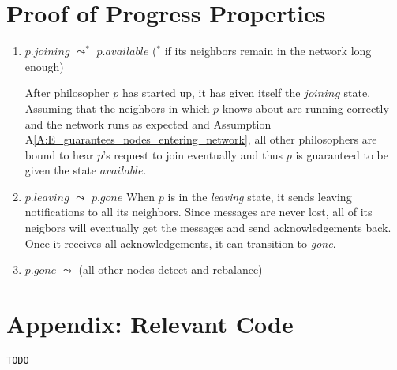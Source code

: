 \documentclass[11pt]{article}
\begin{document}
\section{Proof of Progress Properties}
\begin{enumerate}[PG1]
\item
$p.joining$ $\leadsto^*$ $p.available$ ($^*$ if its neighbors remain in the network long enough) 

\indent After philosopher $p$ has started up, it has given itself the $joining$ state. Assuming that the neighbors in which $p$ knows about are running correctly and the network runs as expected and Assumption A\ref{A:E_guarantees_nodes_entering_network}, all other philosophers are bound to hear $p$'s request to join eventually and thus $p$ is guaranteed to be given the state $available$.

\item 
$p.leaving$ $\leadsto$ $p.gone$
When $p$ is in the \emph{leaving} state, it sends leaving notifications to all its neighbors. Since messages are never lost, all of its neigbors will eventually get the messages and send acknowledgements back. Once it receives all acknowledgements, it can transition to \emph{gone}.

\item 
$p.gone$ $\leadsto$ (all other nodes detect and rebalance)

\end{enumerate}

\section{Appendix: Relevant Code}
\begin{lstlisting}
TODO
\end{lstlisting}
\end{document}
